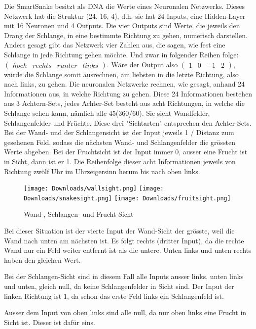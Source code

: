 \documentclass[11pt,a4paper,ngerman]{article}
\begin{document}
Die SmartSnake besitzt als DNA die Werte eines Neuronalen Netzwerks. Dieses Netzwerk hat die Struktur (24, 16, 4), d.h. sie hat 24 Inputs, eine Hidden-Layer mit 16 Neuronen und 4 Outputs. Die vier Outputs sind Werte, die jeweils den Drang der Schlange, in eine bestimmte Richtung zu gehen, numerisch darstellen. Anders gesagt gibt das Netzwerk vier Zahlen aus, die sagen, wie fest eine Schlange in jede Richtung gehen möchte. Und zwar in folgender Reihen folge: $ \left(\begin{array}{cccc} hoch & rechts & runter & links\end{array}\right) $. Wäre der Output also $ \left(\begin{array}{cccc} 1 & 0 & -1 & 2\end{array}\right) $, würde die Schlange somit ausrechnen, am liebsten in die letzte Richtung, also nach links, zu gehen. Die neuronalen Netzwerke rechnen, wie gesagt, anhand 24 Informationen aus, in welche Richtung zu gehen. Diese 24 Informationen bestehen aus 3 Achtern-Sets, jedes Achter-Set besteht aus acht Richtungen, in welche die Schlange sehen kann, nämlich alle 45\degree (360/60). Sie sieht Wandfelder, Schlangenfelder und Früchte. Diese drei "Sichtarten" entsprechen den Achter-Sets. Bei der Wand- und der Schlangensicht ist der Input jeweils 1 / Distanz zum gesehenen Feld, sodass die nächsten Wand- und Schlangenfelder die grössten Werte abgeben. Bei der Fruchtsicht ist der Input immer 0, ausser eine Frucht ist in Sicht, dann ist er 1. Die Reihenfolge dieser acht Informationen jeweils von Richtung zwölf Uhr im Uhrzeigersinn herum bis nach oben links.

\begin{center}
\begin{figure}[H]
    \texttt{[image: Downloads/wallsight.png]}
    \texttt{[image: Downloads/snakesight.png]}
    \texttt{[image: Downloads/fruitsight.png]}
    \caption{Wand-, Schlangen- und Frucht-Sicht}
    \vspace{-2em}
\end{figure}
\end{center}

\begin{multicols}{3}
    Bei dieser Situation ist der vierte Input der Wand-Sicht der grösste, weil die Wand nach unten am nächsten ist. Es folgt rechts (dritter Input), da die rechte Wand nur ein Feld weiter entfernt ist als die untere. Unten links und unten rechts haben den gleichen Wert.
    
    \columnbreak
    
    Bei der Schlangen-Sicht sind in diesem Fall alle Inputs ausser links, unten links und unten, gleich null, da keine Schlangenfelder in Sicht sind. Der Input der linken Richtung ist 1, da schon das erste Feld links ein Schlangenfeld ist.

    \columnbreak

    Ausser dem Input von oben links sind alle null, da nur oben links eine Frucht in Sicht ist. Dieser ist dafür eins.

\end{multicols}
\end{document}
